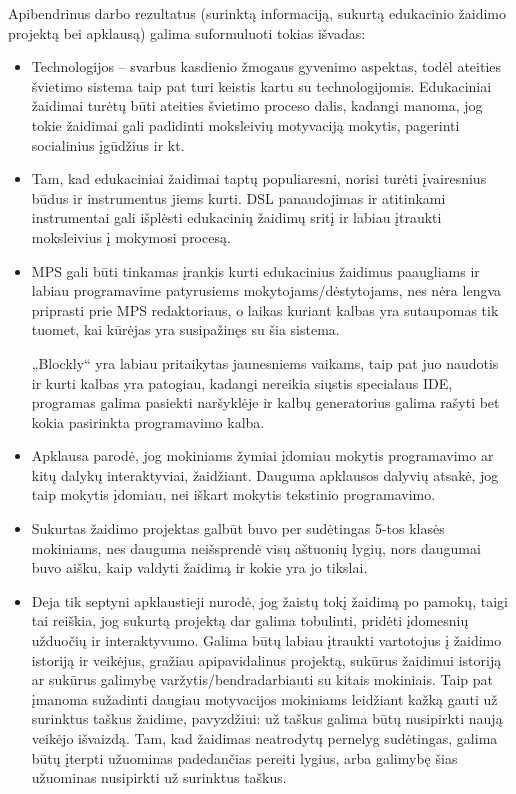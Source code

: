 \documentclass{VUMIFPSkursinis}
\begin{document}
Apibendrinus darbo rezultatus (surinktą informaciją, sukurtą edukacinio žaidimo projektą bei apklausą) galima suformuluoti tokias išvadas:
\begin{itemize}
    \item Technologijos -- svarbus kasdienio žmogaus gyvenimo aspektas, todėl ateities švietimo sistema taip pat turi keistis kartu su technologijomis. Edukaciniai žaidimai turėtų būti ateities švietimo proceso dalis, kadangi manoma, jog tokie žaidimai gali padidinti moksleivių motyvaciją mokytis, pagerinti socialinius įgūdžius ir kt.
    \item Tam, kad edukaciniai žaidimai taptų populiaresni, norisi turėti įvairesnius būdus ir instrumentus jiems kurti. DSL panaudojimas ir atitinkami instrumentai gali išplėsti edukacinių žaidimų sritį ir labiau įtraukti moksleivius į mokymosi procesą.
    \item MPS gali būti tinkamas įrankis kurti edukacinius žaidimus paaugliams ir labiau programavime patyrusiems mokytojams/dėstytojams, nes nėra lengva priprasti prie MPS redaktoriaus, o laikas kuriant kalbas yra sutaupomas tik tuomet, kai kūrėjas yra susipažinęs su šia sistema.
    
    „Blockly“ yra labiau pritaikytas jaunesniems vaikams, taip pat juo naudotis ir kurti kalbas yra patogiau, kadangi nereikia siųstis specialaus IDE, programas galima pasiekti naršyklėje ir kalbų generatorius galima rašyti bet kokia pasirinkta programavimo kalba.
    \item Apklausa parodė, jog mokiniams žymiai įdomiau mokytis programavimo ar kitų dalykų interaktyviai, žaidžiant. Dauguma apklausos dalyvių atsakė, jog taip mokytis įdomiau, nei iškart mokytis tekstinio programavimo.
    \item Sukurtas žaidimo projektas galbūt buvo per sudėtingas 5-tos klasės mokiniams, nes dauguma neišsprendė visų aštuonių lygių, nors daugumai buvo aišku, kaip valdyti žaidimą ir kokie yra jo tikslai. 
    \item Deja tik septyni apklaustieji nurodė, jog žaistų tokį žaidimą po pamokų, taigi tai reiškia, jog sukurtą projektą dar galima tobulinti, pridėti įdomesnių užduočių ir interaktyvumo. Galima būtų labiau įtraukti vartotojus į žaidimo istoriją ir veikėjus, gražiau apipavidalinus projektą, sukūrus žaidimui istoriją ar sukūrus galimybę varžytis/bendradarbiauti su kitais mokiniais. Taip pat įmanoma sužadinti daugiau motyvacijos mokiniams leidžiant kažką gauti už surinktus taškus žaidime, pavyzdžiui: už taškus galima būtų nusipirkti naują veikėjo išvaizdą. Tam, kad žaidimas neatrodytų pernelyg sudėtingas, galima būtų įterpti užuominas padedančias pereiti lygius, arba galimybę šias užuominas nusipirkti už surinktus taškus.
\end{itemize}
\end{document}
